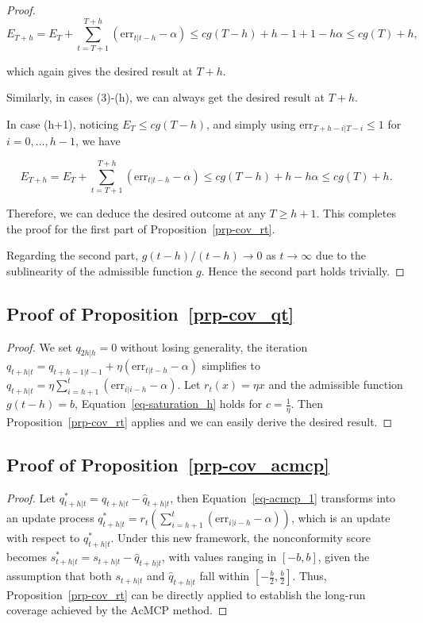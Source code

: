 \documentclass[
  11pt,
  a4paper,
]{article}
\theoremstyle{plain}
\theoremstyle{remark}
\begin{document}
\begin{proof}
\[
E_{T+h} = E_T+\sum_{t=T+1}^{T+h}(\mathrm{err}_{t|t-h}-\alpha) \leq cg(T-h)+h-1+1-h\alpha \leq cg(T)+h,
\]

which again gives the desired result at \(T+h\).

Similarly, in cases (3)-(h), we can always get the desired result at
\(T+h\).

In case (h+1), noticing \(E_T \leq cg(T-h)\), and simply using
\(\mathrm{err}_{T+h-i|T-i} \leq 1\) for \(i=0,\ldots,h-1\), we have

\[
E_{T+h} = E_T+\sum_{t=T+1}^{T+h}(\mathrm{err}_{t|t-h}-\alpha) \leq cg(T-h)+h-h\alpha \leq cg(T)+h.
\]

Therefore, we can deduce the desired outcome at any \(T \geq h+1\). This
completes the proof for the first part of Proposition~\ref{prp-cov_rt}.

Regarding the second part, \(g(t-h)/(t-h) \rightarrow 0\) as
\(t \rightarrow \infty\) due to the sublinearity of the admissible
function \(g\). Hence the second part holds trivially.
\end{proof}

\subsection{\texorpdfstring{Proof of
Proposition~\ref{prp-cov_qt}}{Proof of Proposition~}}\label{sec-proof_cov_qt}

\begin{proof}
We set \(q_{2h|h}=0\) without losing generality, the iteration
\(q_{t+h|t}=q_{t+h-1|t-1}+\eta \left(\mathrm{err}_{t|t-h}-\alpha\right)\)
simplifies to
\(q_{t+h|t}=\eta \sum_{i=h+1}^{t}\left(\mathrm{err}_{i|i-h}-\alpha\right)\).
Let \(r_t(x) = \eta x\) and the admissible function \(g(t-h) = b\),
Equation~\ref{eq-saturation_h} holds for \(c=\frac{1}{\eta}\). Then
Proposition~\ref{prp-cov_rt} applies and we can easily derive the
desired result.
\end{proof}

\subsection{\texorpdfstring{Proof of
Proposition~\ref{prp-cov_acmcp}}{Proof of Proposition~}}\label{sec-proof_cov_acmcp}

\begin{proof}
Let \(q_{t+h|t}^{*}=q_{t+h|t}-\hat{q}_{t+h|t}\), then
Equation~\ref{eq-acmcp_1} transforms into an update process
\(q_{t+h|t}^{*}=r_t\left(\sum_{i=h+1}^t \left(\mathrm{err}_{i|i-h}-\alpha\right)\right)\),
which is an update with respect to \(q_{t+h|t}^{*}\). Under this new
framework, the nonconformity score becomes
\(s_{t+h|t}^{*}=s_{t+h|t}-\hat{q}_{t+h|t}\), with values ranging in
\([-b,b]\), given the assumption that both \(s_{t+h|t}\) and
\(\hat{q}_{t+h|t}\) fall within \([-\frac{b}{2},\frac{b}{2}]\). Thus,
Proposition~\ref{prp-cov_rt} can be directly applied to establish the
long-run coverage achieved by the AcMCP method.
\end{proof}
\end{document}
